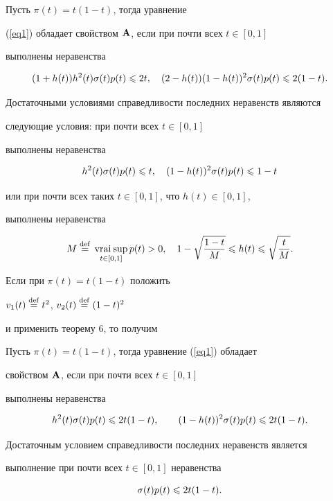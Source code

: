 \begin{cor}


Пусть $\pi(t)=t(1-t)$, тогда уравнение


(\ref{eq1}) обладает свойством $\bold A$, если при почти всех $t\in[0,1]$


выполнены неравенства


$$


(1+h(t))h^2(t)\s(t)p(t)\le{2t},\q


(2-h(t))(1-h(t))^2\s(t)p(t)\le2(1-t).


$$





Достаточными условиями справедливости последних неравенств являются


следующие условия: при почти всех $t\in[0,1]$


выполнены неравенства


$$


h^2(t)\s(t)p(t)\le{t},\q


{(1-h(t))^2}\s(t)p(t)\le{1-t}


$$


или при почти всех таких $t\in[0,1]$, что $h(t)\in[0,1]$,


выполнены неравенства


$$


M\df\vs\limits_{t\in[0,1]}p(t)>0,\q


1-\sqrt{\frac{1-t}{M}}\le h(t)\le\sqrt{\frac{t}{M}}.


$$


\end{cor}





Если при $\pi(t)=t(1-t)$ положить


$v_1(t)\overset{\mathrm{def}}{=}{} t^2$, $v_2(t)\overset{\mathrm{def}}{=}{} (1-t)^2$


и применить теорему 6, то получим





\begin{cor}


Пусть $\pi(t)=t(1-t)$, тогда уравнение (\ref{eq1}) обладает


свойством $\bold A$, если при почти всех $t\in[0,1]$


выполнены неравенства


$$


{h^2(t)}\s(t)p(t)\le{2t(1-t)},\qq


{(1-h(t))^2}\s(t)p(t)\le{2t(1-t)}.


$$


Достаточным условием справедливости последних неравенств является


выполнение при почти всех $t\in [0,1]$ неравенства


$$


\s(t)p(t)\le{2t(1-t)}.


$$


\end{cor}





